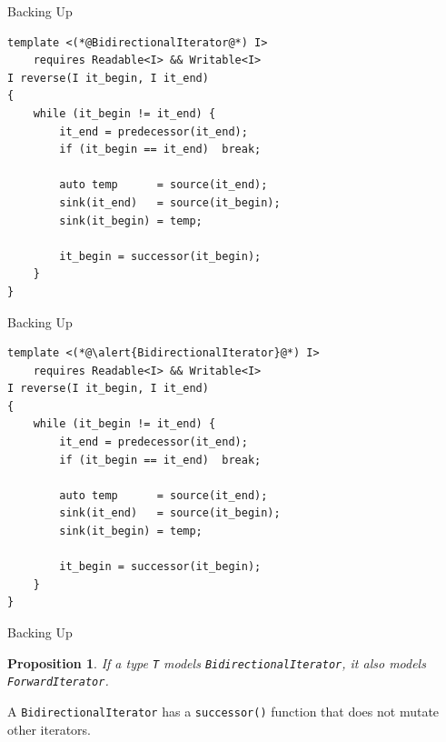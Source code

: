 \documentclass[aspectratio=169]{beamer}
\newtheorem{claim}{Proposition}
\begin{document}

\begin{frame}[fragile]{Backing Up}
  \small
\begin{lstlisting}
template <(*@BidirectionalIterator@*) I>
    requires Readable<I> && Writable<I>
I reverse(I it_begin, I it_end)
{
    while (it_begin != it_end) {
        it_end = predecessor(it_end);
        if (it_begin == it_end)  break;

        auto temp      = source(it_end);
        sink(it_end)   = source(it_begin);
        sink(it_begin) = temp;

        it_begin = successor(it_begin);
    }
}
\end{lstlisting}
\end{frame}


\begin{frame}[fragile]{Backing Up}
  \small
\begin{lstlisting}
template <(*@\alert{BidirectionalIterator}@*) I>
    requires Readable<I> && Writable<I>
I reverse(I it_begin, I it_end)
{
    while (it_begin != it_end) {
        it_end = predecessor(it_end);
        if (it_begin == it_end)  break;

        auto temp      = source(it_end);
        sink(it_end)   = source(it_begin);
        sink(it_begin) = temp;

        it_begin = successor(it_begin);
    }
}
\end{lstlisting}
\end{frame}


\begin{frame}[fragile]{Backing Up}
  \begin{claim}
    If a type \texttt{T} models \texttt{BidirectionalIterator}, it also
    models \texttt{ForwardIterator}.
  \end{claim}
  \pause{}
  \begin{center}
    A \texttt{BidirectionalIterator} has a \texttt{successor()}
    function that does not mutate other iterators.
  \end{center}
\end{frame}

\end{document}
